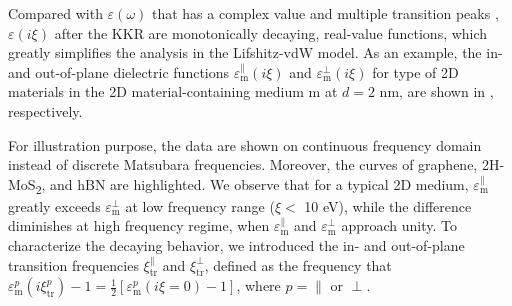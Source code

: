 Compared with $\varepsilon(\omega)$ that has a complex value and
multiple transition peaks ,
$\varepsilon(i \xi)$ after the KKR are monotonically decaying,
real-value functions, which greatly simplifies the analysis in the Lifshitz-vdW model.
%
As an example, the in- and out-of-plane dielectric functions
$\varepsilon_{\mathrm{m}}^{\parallel}(i \xi)$ and
$\varepsilon_{\mathrm{m}}^{\perp}(i \xi)$ for  type of 2D
materials in the 2D material-containing medium m at $d=2$ nm, are
shown in , respectively.
%

\begin{figure}[h]
  \centering
  \caption{\label{fig:vdw-eps-iv-all} %
  }
\end{figure}
For illustration purpose, the data are shown on continuous frequency
domain instead of discrete Matsubara frequencies. Moreover, the curves
of graphene, 2H-MoS\textsubscript{2}, and hBN are
highlighted. 
%
We observe that for a typical 2D medium,
\(\varepsilon_{\mathrm{m}}^{\parallel}\) greatly exceeds
\(\varepsilon_{\mathrm{m}}^{\perp}\) at low frequency range ($\xi <$
10 eV), while the difference diminishes at high frequency regime, when
$\varepsilon_{\mathrm{m}}^{\parallel}$ and
$\varepsilon_{\mathrm{m}}^{\perp}$ approach unity.
%
To characterize the decaying behavior, we introduced the in- and
out-of-plane transition frequencies \(\xi_{\mathrm{tr}}^{\parallel}\)
and \(\xi_{\mathrm{tr}}^{\perp}\), defined as the frequency that
\(\varepsilon_{\mathrm{m}}^{p}(i \xi^{p}_{\mathrm{tr}}) - 1 =
\frac{1}{2}[\varepsilon_{\mathrm{m}}^{p}(i\xi=0) - 1]\), where
$p=\parallel$ or $\perp$.
%

